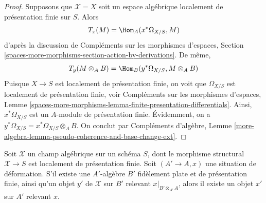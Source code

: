 \begin{proof}
\medskip\noindent
Supposons que $\mathcal{X} = X$ soit un espace algébrique localement de
présentation finie sur $S$. Alors
$$
T_x(M) = \Hom_A(x^*\Omega_{X/S}, M)
$$
d'après la discussion de Compléments sur les morphismes d'espaces, Section
\ref{spaces-more-morphisms-section-action-by-derivations}.
De même,
$$
T_y(M \otimes_A B) = \Hom_B(y^*\Omega_{X/S}, M \otimes_A B)
$$
Puisque $X \to S$ est localement de présentation finie, on voit que
$\Omega_{X/S}$ est localement de présentation finie, voir
Compléments sur les morphismes d'espaces, Lemme
\ref{spaces-more-morphisms-lemma-finite-presentation-differentials}.
Ainsi, $x^*\Omega_{X/S}$ est un $A$-module de présentation finie.
Évidemment, on a $y^*\Omega_{X/S} = x^*\Omega_{X/S} \otimes_A B$.
On conclut par Compléments d'algèbre, Lemme
\ref{more-algebra-lemma-pseudo-coherence-and-base-change-ext}.
\end{proof}

\begin{lemma}
\label{lemma-local-lift-enough}
Soit $\mathcal{X}$ un champ algébrique sur un schéma $S$, dont le
morphisme structural $\mathcal{X} \to S$ est localement de présentation finie.
Soit $(A' \to A, x)$ une situation de déformation. S'il existe une
$A'$-algèbre $B'$ fidèlement plate et de présentation finie, ainsi qu'un
objet $y'$ de $\mathcal{X}$ sur $B'$ relevant $x|_{B' \otimes_{A'} A}$,
alors il existe un objet $x'$ sur $A'$ relevant $x$.
\end{lemma}

